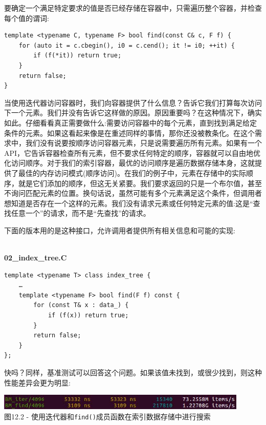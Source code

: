 要确定一个满足特定要求的值是否已经存储在容器中，只需遍历整个容器，并检查每个值的谓词:

\begin{lstlisting}[style=styleCXX]
template <typename C, typename F> bool find(const C& c, F f) {
	for (auto it = c.cbegin(), i0 = c.cend(); it != i0; ++it) {
		if (f(*it)) return true;
	}
	return false;
}
\end{lstlisting}

当使用迭代器访问容器时，我们向容器提供了什么信息？告诉它我们打算每次访问下一个元素。我们并没有告诉它这样做的原因。原因重要吗？在这种情况下，确实如此。仔细看看真正需要做什么:需要访问容器中的每个元素，直到找到满足给定条件的元素。如果这看起来像是在重述同样的事情，那你还没被教条化。在这个需求中，我们没有说要按顺序访问容器元素，只是说需要遍历所有元素。如果有一个API，它告诉容器检查所有元素，但不要求任何特定的顺序，容器就可以自由地优化访问顺序。对于我们的索引容器，最优的访问顺序是遍历数据存储本身，这就提供了最佳的内存访问模式(顺序访问)。在我们的例子中，元素在存储中的实际顺序，就是它们添加的顺序，但这无关紧要。我们要求返回的只是一个布尔值，甚至不询问匹配元素的位置。换句话说，虽然可能有多个元素满足这个条件，但调用者想知道是否存在一个这样的元素。我们没有请求元素或任何特定元素的值:这是“查找任意一个”的请求，而不是“先查找”的请求。 

下面的版本用的是这种接口，允许调用者提供所有相关信息和可能的实现:

\hspace*{\fill} \\ %
\noindent
\textbf{02\_index\_tree.C}
\begin{lstlisting}[style=styleCXX]
template <typename T> class index_tree {
	…
	template <typename F> bool find(F f) const {
		for (const T& x : data_) {
			if (f(x)) return true;
		}
		return false;
	}
};
\end{lstlisting}

快吗？同样，基准测试可以回答这个问题。如果该值未找到，或很少找到，则这种性能差异会更为明显:

\begin{center}
\includegraphics[width=0.9\textwidth]{content/3/chapter12/images/2.jpg}\\
图12.2 - 使用迭代器和\texttt{find()}成员函数在索引数据存储中进行搜索
\end{center}

